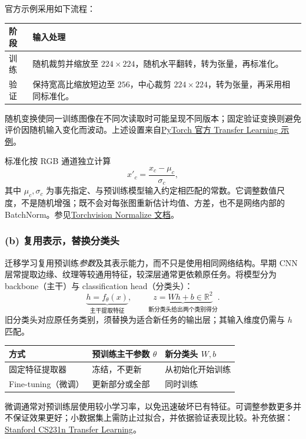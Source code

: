 官方示例采用如下流程：
\begin{center}
\begin{tabularx}{\textwidth}{@{}lX@{}}
\toprule
阶段 & 输入处理 \\
\midrule
训练 & 随机裁剪并缩放至 $224\times224$，随机水平翻转，转为张量，再标准化。 \\
验证 & 保持宽高比缩放短边至 $256$，中心裁剪 $224\times224$，转为张量，再采用相同标准化。 \\
\bottomrule
\end{tabularx}
\end{center}
随机变换使同一训练图像在不同次读取时可能呈现不同版本；固定验证变换则避免评价因随机输入变化而波动。上述设置来自\href{https://docs.pytorch.org/tutorials/beginner/transfer_learning_tutorial.html}{PyTorch 官方 Transfer Learning 示例}。

标准化按 RGB 通道独立计算
\[
x'_c=\frac{x_c-\mu_c}{\sigma_c},
\]
其中 $\mu_c,\sigma_c$ 为事先指定、与预训练模型输入约定相匹配的常数。它调整数值尺度，不是随机增强；既不会对每张图重新估计均值、方差，也不是网络内部的 BatchNorm。参见\href{https://docs.pytorch.org/vision/stable/generated/torchvision.transforms.Normalize.html}{Torchvision Normalize 文档}。

\subsubsection*{(b) 复用表示，替换分类头}
迁移学习复用预训练\emph{参数}及其表示能力，而不只是使用相同网络结构。早期 CNN 层常提取边缘、纹理等较通用特征，较深层通常更依赖原任务。将模型分为 backbone（主干）与 classification head（分类头）：
\[
\underbrace{h=f_\theta(x)}_{\text{主干提取特征}},\qquad
\underbrace{z=Wh+b\in\mathbb{R}^{2}}_{\text{新分类头给出两个类别得分}}.
\]
旧分类头对应原任务类别，须替换为适合新任务的输出层；其输入维度仍需与 $h$ 匹配。
\begin{center}
\begin{tabularx}{\textwidth}{@{}lXX@{}}
\toprule
方式 & 预训练主干参数 $\theta$ & 新分类头 $W,b$ \\
\midrule
固定特征提取器 & 冻结，不更新 & 从初始化开始训练 \\
Fine-tuning（微调） & 更新部分或全部 & 同时训练 \\
\bottomrule
\end{tabularx}
\end{center}
微调通常对预训练层使用较小学习率，以免迅速破坏已有特征。可调整参数更多并不保证效果更好；小数据集上需防止过拟合，并依据验证表现比较。补充依据：\href{https://cs231n.github.io/transfer-learning/}{Stanford CS231n Transfer Learning}。

